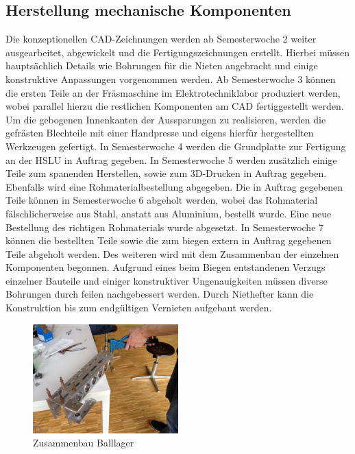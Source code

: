 \subsection{Herstellung mechanische Komponenten}
Die konzeptionellen CAD-Zeichnungen werden ab Semesterwoche 2 weiter 
ausgearbeitet, abgewickelt und die Fertigungszeichnungen erstellt. Hierbei 
müssen hauptsächlich Details wie Bohrungen für die Nieten angebracht und 
einige konstruktive Anpassungen vorgenommen werden. 
Ab Semesterwoche 3 können die ersten Teile an der Fräsmaschine im 
Elektrotechniklabor produziert werden, wobei parallel  hierzu die restlichen 
Komponenten am CAD fertiggestellt werden.  Um die gebogenen Innenkanten der 
Aussparungen zu realisieren, werden die gefrästen Blechteile mit einer 
Handpresse und eigens hierfür hergestellten Werkzeugen gefertigt.
In Semesterwoche 4 werden die Grundplatte zur Fertigung an der HSLU in Auftrag 
gegeben.
In Semesterwoche 5 werden zusätzlich einige Teile zum spanenden Herstellen, 
sowie zum 3D-Drucken in Auftrag gegeben. Ebenfalls wird eine 
Rohmaterialbestellung abgegeben.
Die in Auftrag gegebenen Teile können in Semesterwoche 6 abgeholt werden, 
wobei das  Rohmaterial fälschlicherweise aus Stahl, anstatt aus Aluminium, 
bestellt wurde. Eine neue Bestellung des richtigen Rohmaterials wurde abgesetzt.
In Semesterwoche 7 können die bestellten Teile sowie die zum biegen extern in 
Auftrag gegebenen Teile abgeholt werden. Des weiteren wird mit dem Zusammenbau 
der einzelnen Komponenten begonnen. Aufgrund eines beim Biegen entstandenen 
Verzugs einzelner Bauteile und einiger konstruktiver Ungenauigkeiten müssen 
diverse Bohrungen durch feilen nachgebessert werden. Durch Niethefter kann die 
Konstruktion bis zum endgültigen Vernieten aufgebaut werden.

\begin{figure}[h!]
	\centering
	\includegraphics[width=0.5\textwidth]{fig/IMG_2290.JPG}
	\caption{Zusammenbau Balllager}
	\label{fig:Zusammenbau Balllager}
\end{figure}

